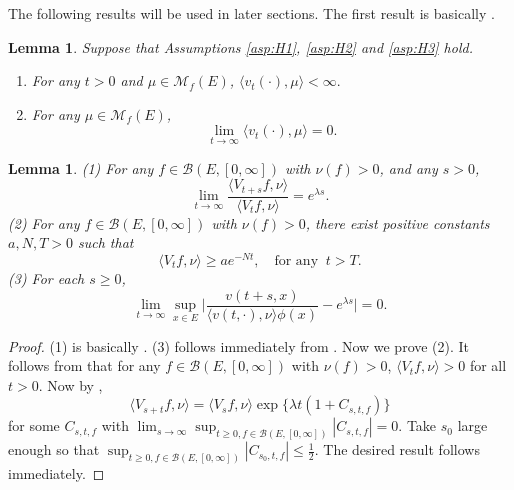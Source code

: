 \documentclass[12pt,a4paper]{amsart}
\numberwithin{equation}{section}
\theoremstyle{plain}
\newtheorem{lem}[thm]{Lemma}
\theoremstyle{definition}
\theoremstyle{remark}
\begin{document}
{\color{gray}
The following results will be used in later sections. The first result is basically
\cite[Proposition 1.3]{LiuRenSongSun2020}.
\begin{lem}\label{lem:extinc}
	Suppose that Assumptions \eqref{asp:H1}, \eqref{asp:H2} and \eqref{asp:H3} hold.
\begin{enumerate}
\item	
	For any  $ t>0$ and $ \mu \in \mathcal M_f(E)$, $\langle v_t(\cdot),\mu\rangle <\infty.$
\item	For any $\mu \in \mathcal M_f(E)$,
\[
	\lim_{t\rightarrow\infty}\langle v_t(\cdot),\mu\rangle=0.
\]
\end{enumerate}
\end{lem}

\begin{lem}\label{lem:ratio limit}
(1) For any $f\in\mathcal B(E,[0,\infty])$ with $\nu(f)>0$, and any $s>0$,
\begin{equation}\label{integ ratio limit}
\lim_{t\to\infty}\dfrac{\langle V_{t+s}f, \nu\rangle}{\langle V_{t}f, \nu\rangle}=e^{\lambda s}.
\end{equation}
(2) 
For any $f\in\mathcal B(E,[0,\infty])$ with $\nu(f)>0$, there exist positive constants $a,N,T>0$ such that
\begin{equation}\label{inequ:lower}
\langle V_{t}f, \nu\rangle\geq ae^{-Nt},\quad \mbox{for any }\ t>T.
\end{equation}
(3) For each $s\geq 0$,
\begin{equation} \label{one point ratio limit}
	\lim_{t\to \infty} \sup_{x\in E}\Big|\frac{v(t+s,x)}{\langle v(t,\cdot),\nu\rangle\phi(x) } - e^{\lambda s} \Big|=0.
\end{equation}
\end{lem}

\begin{proof}
(1) is basically \cite[(2.20)]{LiuRenSongSun2020}. (3) follows immediately from
\cite[(2.20) and Proposition 1.4]{LiuRenSongSun2020}. Now we prove (2).
It follows from\cite[(2.4)]{LiuRenSongSun2020} that for any $f\in\mathcal B(E,[0,\infty])$ with $\nu(f)>0$, $\langle V_{t}f, \nu\rangle>0$ for all $t>0$. Now by \cite[(2.20)]{LiuRenSongSun2020},
$$
\langle V_{s+t}f, \nu\rangle=\langle V_{s}f, \nu\rangle\exp\{\lambda t(1+C_{s, t, f})\}
$$
for some $C_{s, t, f}$ with $\lim_{s\to\infty}\sup_{t\ge 0, f\in \mathcal B(E,[0,\infty])}|C_{s, t, f}|=0$. Take $s_0$ large enough so that $\sup_{t\ge 0, f\in \mathcal B(E,[0,\infty])}|C_{s_0, t, f}|\le \frac12$. The desired result follows immediately.
\end{proof}
}
\end{document}
